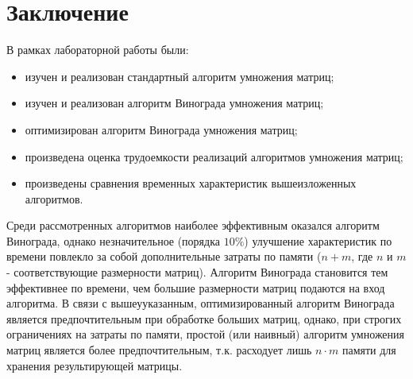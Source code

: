 \chapter*{Заключение}

В рамках лабораторной работы были:
\begin{itemize}
	\item изучен и реализован стандартный алгоритм умножения матриц;
	\item изучен и реализован алгоритм Винограда умножения матриц;
	\item оптимизирован алгоритм Винограда умножения матриц;
	\item произведена оценка трудоемкости реализаций алгоритмов умножения матриц;
	\item произведены сравнения временных характеристик вышеизложенных алгоритмов.
\end{itemize}
 
Среди рассмотренных алгоритмов наиболее эффективным оказался алгоритм Винограда, однако незначительное (порядка $ 10\% $) улучшение характеристик по времени повлекло за собой дополнительные затраты по памяти ($n + m$, где $n$ и $m$ - соответствующие размерности матриц).
Алгоритм Винограда становится тем эффективнее по времени, чем большие размерности матриц подаются на вход алгоритма.
В связи с вышеууказанным, оптимизированный алгоритм Винограда является предпочтительным при обработке больших матриц, однако, при строгих ограничениях на затраты по памяти, простой (или наивный) алгоритм умножения матриц является более предпочтительным, т.к. расходует лишь $n \cdot m$ памяти для хранения результирующей матрицы.